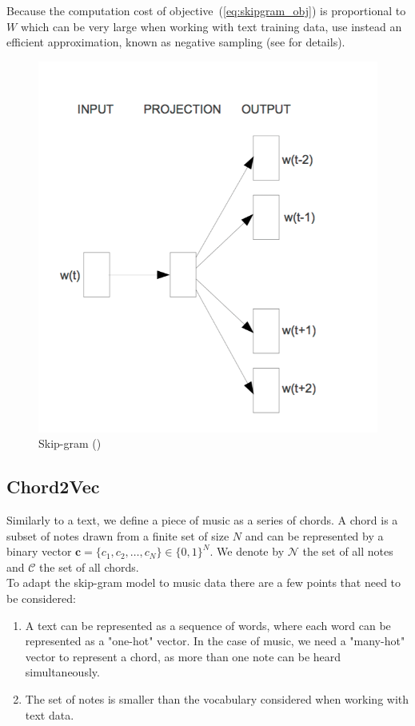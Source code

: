 \documentclass[12pt]{article}\pagestyle{myheadings}
\newcommand{\boldc}{\boldsymbol c}
\begin{document}
Because the computation cost of objective~(\ref{eq:skipgram_obj}) is proportional to $W$ which can be very large when working with text training data, \citet{mik2013} use instead an efficient approximation, known as negative sampling (see \citep{NIPS2013_5021} for details). 

\begin{figure}[ht]
\centering
\includegraphics[width=.7\linewidth]{figures/skipgram.png}
\caption{\label{fig:skipgram}Skip-gram (\citet{mik2013})}
\end{figure}


\subsection{Chord2Vec}
Similarly to a text, we define a piece of music as a series of chords. A chord is a subset of notes drawn from a finite set of size $N$ and can be represented by a binary vector $\boldc = \{c_1, c_2, \ldots, c_N\}\in \{0,1\}^N$. We denote by $\mathcal{N}$ the set of all notes and $\mathcal{C}$ the set of all chords.\\
\noindent To adapt the skip-gram model to music data there are a few points that need to be considered:

\begin{enumerate}
\item A text can be represented as a sequence of words, where each word can be represented as a "one-hot" vector. In the case of music, we need a "many-hot" vector to represent a chord, as more than one note can be heard simultaneously.  
\item The set of notes is smaller than the vocabulary considered when working with text data.
\end{enumerate}
 
\end{document}
